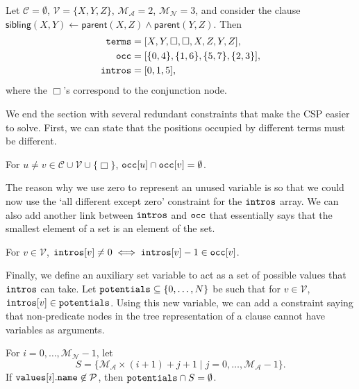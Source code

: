 \documentclass[runningheads]{llncs}
\newcommand{\variable}[1]{\texttt{\textup{#1}}}
\newcommand{\predicates}{\mathcal{P}}
\newcommand{\variables}{\mathcal{V}}
\newcommand{\constants}{\mathcal{C}}
\newcommand{\maxArity}{\mathcal{M}_{\mathcal{A}}}
\newcommand{\maxNumNodes}{\mathcal{M}_{\mathcal{N}}}
\begin{document}
\begin{example} \label{example:sibling}
  Let $\constants{} = \emptyset$, $\variables{} = \{ X, Y, Z \}$, $\maxArity{} =
  2$, $\maxNumNodes{} = 3$, and consider the clause $\mathsf{sibling}(X, Y)
  \gets \mathsf{parent}(X, Z) \land \mathsf{parent}(Y, Z)$. Then
  \begin{align*}
    \variable{terms} &= [X, Y, \Box, \Box, X, Z, Y, Z], \\
    \variable{occ} &= [\{ 0, 4 \}, \{ 1, 6 \}, \{ 5, 7 \}, \{ 2, 3 \}], \\
    \variable{intros} &= [0, 1, 5],
  \end{align*}
  where the $\Box$'s correspond to the conjunction node.
\end{example}

We end the section with several redundant constraints that make the CSP easier
to solve. First, we can state that the positions occupied by different terms
must be different.
\begin{constraint} \label{constraint:all_diff}
  For $u \ne v \in \constants{} \cup \variables{} \cup \{ \Box \}$,
  $\variable{occ}[u] \cap \variable{occ}[v] = \emptyset$.
\end{constraint}
The reason why we use zero to represent an unused variable is so that we could
now use the `all different except zero' constraint for the $\variable{intros}$
array. We can also add another link between $\variable{intros}$ and
$\variable{occ}$ that essentially says that the smallest element of a set is an
element of the set.
\begin{constraint}
  For $v \in \variables{}$, $\variable{intros}[v] \ne 0 \iff
  \variable{intros}[v] - 1 \in \variable{occ}[v]$.
\end{constraint}
Finally, we define an auxiliary set variable to act as a set of possible values
that $\variable{intros}$ can take. Let $\variable{potentials} \subseteq \{ 0,
\dots, N \}$ be such that for $v \in \variables{}$, $\variable{intros}[v] \in
\variable{potentials}$. Using this new variable, we can add a constraint saying
that non-predicate nodes in the tree representation of a clause cannot have
variables as arguments.
\begin{constraint} \label{constraint:potentialIntroductions}
  For $i = 0, \dots, \maxNumNodes{} - 1$, let
  \[
    S = \{ \maxArity{} \times (i + 1) + j + 1 \mid j = 0, \dots, \maxArity{} - 1
    \}.
  \]
  If $\variable{values}[i].\variable{name} \not\in \predicates{}$, then
  $\variable{potentials} \cap S = \emptyset$.
\end{constraint}
\end{document}
